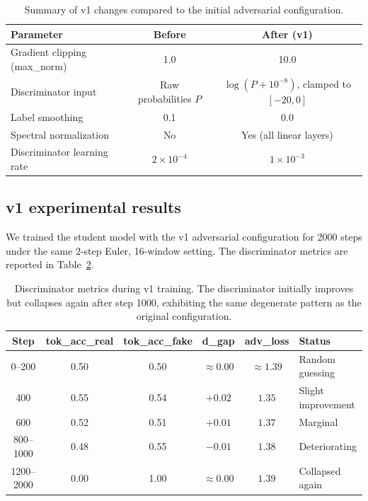 \documentclass{article}
\begin{document}
\begin{table}[t]
\centering
\caption{Summary of v1 changes compared to the initial adversarial configuration.}
\label{tab:v1_changes}
\begin{tabular}{lcc}
\toprule
\textbf{Parameter} & \textbf{Before} & \textbf{After (v1)} \\
\midrule
Gradient clipping (max\_norm) & 1.0 & 10.0 \\
Discriminator input & Raw probabilities $P$ & $\log(P + 10^{-8})$, clamped to $[-20, 0]$ \\
Label smoothing & 0.1 & 0.0 \\
Spectral normalization & No & Yes (all linear layers) \\
Discriminator learning rate & $2 \times 10^{-4}$ & $1 \times 10^{-3}$ \\
\bottomrule
\end{tabular}
\end{table}

\subsection{v1 experimental results}

We trained the student model with the v1 adversarial configuration for 2000 steps under the same 2-step Euler, 16-window setting. The discriminator metrics are reported in Table~\ref{tab:v1_disc}.

\begin{table}[t]
\centering
\caption{Discriminator metrics during v1 training. The discriminator initially improves but collapses again after step 1000, exhibiting the same degenerate pattern as the original configuration.}
\label{tab:v1_disc}
\begin{tabular}{cccccl}
\toprule
\textbf{Step} & \textbf{tok\_acc\_real} & \textbf{tok\_acc\_fake} & \textbf{d\_gap} & \textbf{adv\_loss} & \textbf{Status} \\
\midrule
0--200   & 0.50 & 0.50 & $\approx 0.00$ & $\approx 1.39$ & Random guessing \\
400      & 0.55 & 0.54 & $+0.02$ & $1.35$ & Slight improvement \\
600      & 0.52 & 0.51 & $+0.01$ & $1.37$ & Marginal \\
800--1000  & 0.48 & 0.55 & $-0.01$ & $1.38$ & Deteriorating \\
1200--2000 & 0.00 & 1.00 & $\approx 0.00$ & $1.39$ & Collapsed again \\
\bottomrule
\end{tabular}
\end{table}
\end{document}
